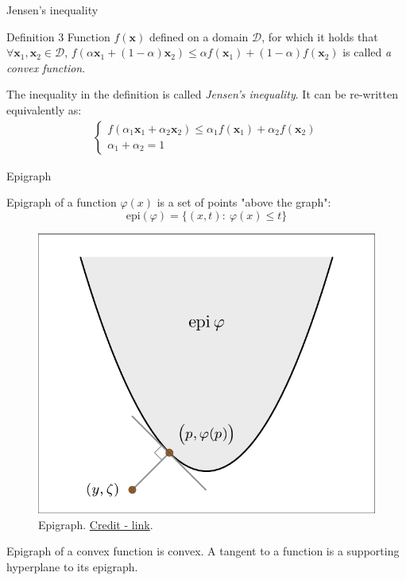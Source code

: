 \documentclass{beamer}
\begin{document}
\begin{frame}{Jensen’s inequality}
	\begin{flushleft}
		
		
		\begin{block}{Definition 3}
			Function $f(\mathbf{x})$ defined on a domain $\mathcal{D}$, for which it holds that $\forall \mathbf{x}_1, \mathbf{x}_2 \in \mathcal{D}$, $f(\alpha \mathbf{x}_1 + (1 - \alpha) \mathbf{x}_2) \leq \alpha f(\mathbf{x}_1) + (1 - \alpha) f(\mathbf{x}_2)$ is called \emph{a convex function}.
		\end{block}
		
		\bigskip
		
		The inequality in the definition is called \emph{Jensen’s inequality}. It can be re-written equivalently as:
		\begin{align}
			\begin{cases}
				f(\alpha_1 \mathbf{x}_1 + \alpha_2 \mathbf{x}_2) \leq \alpha_1 f(\mathbf{x}_1) + \alpha_2 f(\mathbf{x}_2)
				\\
				\alpha_1 + \alpha_2 = 1
			\end{cases}
		\end{align}
		
		
	\end{flushleft}
\end{frame}




\begin{frame}{Epigraph}
	\begin{flushleft}
		
		Epigraph of a function $\varphi(x)$ is a set of points "above the graph":
		\begin{equation}
			\text{epi} (\varphi) = \{ (x, t): \ \varphi(x) \leq t \}
		\end{equation}
		\begin{figure}
			\centering
			\includegraphics[width=0.5\linewidth]{epigraph}
			\caption{Epigraph. \small{\href{https://www.researchgate.net/figure/Projection-onto-the-epigraph-of-a-function-ph-G-0-R_fig1_270905703}{Credit - link}.} }
			\label{fig:epigraph}
		\end{figure}
		
		Epigraph of a convex function is convex. A tangent to a function is a supporting hyperplane to its epigraph.
		
		
	\end{flushleft}
\end{frame}
\end{document}
